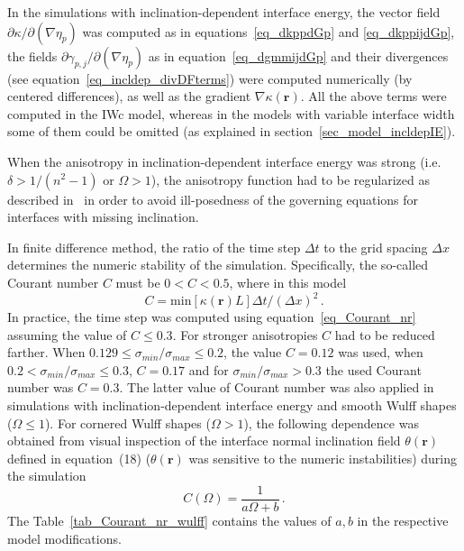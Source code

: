 In the simulations with inclination-dependent interface energy, the vector field $\partial \kappa/\partial(\nabla\eta_p)$ was computed as in equations~\eqref{eq_dkppdGp} and \eqref{eq_dkppijdGp}, the fields $\partial \gamma_{p,j}/\partial(\nabla\eta_p)$ as in equation~\eqref{eq_dgmmijdGp} and their divergences (see equation~\eqref{eq_incldep_divDFterms}) were computed numerically (by centered differences), as well as the gradient $\nabla\kappa(\bm{r})$. All the above terms were computed in the IWc model, whereas in the models with variable interface width some of them could be omitted (as explained in section~\ref{sec_model_incldepIE}).

When the anisotropy in inclination-dependent interface energy was strong (i.e. $\delta>1/(n^2-1)$ or $\Omega>1$), the anisotropy function had to be regularized as described in~\cite{Eggleston2001} in order to avoid ill-posedness of the governing equations for interfaces with missing inclination.

In finite difference method, the ratio of the time step $\Delta t$ to the grid spacing $\Delta x$ determines the numeric stability of the simulation. Specifically, the so-called Courant number $C$ must be $0<C<0.5$, where in this model
\begin{equation}\label{eq_Courant_nr}
	C = \mathrm{min}[\kappa(\bm{r}) L]\Delta t/(\Delta x)^2  \,.
\end{equation}
In practice, the time step was computed using equation~\eqref{eq_Courant_nr} assuming the value of $C\leq0.3$. For stronger anisotropies $C$ had to be reduced farther. When $0.129\leq \sigma_{min}/\sigma_{max}\leq0.2$, the value $C=0.12$ was used, when $0.2 < \sigma_{min}/\sigma_{max}\leq0.3$, $C=0.17$ and for $\sigma_{min}/\sigma_{max} > 0.3$ the used Courant number was $C=0.3$. The latter value of Courant number was also applied in simulations with inclination-dependent interface energy and smooth Wulff shapes ($\Omega\leq1$). For cornered Wulff shapes ($\Omega>1$), the following dependence was obtained from visual inspection of the interface normal inclination field $\theta(\bm{r})$ defined in equation~(18) ($\theta(\bm{r})$ was sensitive to the numeric instabilities) during the simulation 
\begin{equation} \label{eq_Courant_nr_wulff}
	C(\Omega) = \frac{1}{a\Omega + b} \,.
\end{equation}
The Table~\ref{tab_Courant_nr_wulff} contains the values of $a,b$ in the respective model modifications.


